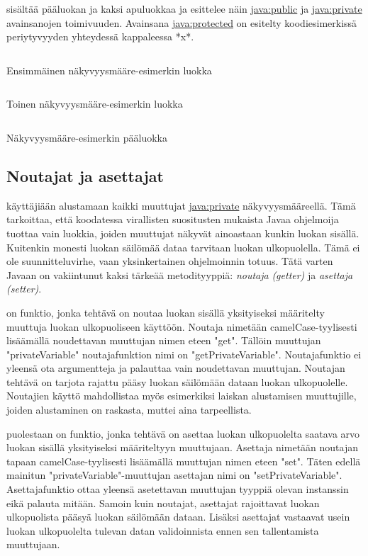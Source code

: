 \documentclass{tufte-book}
\newcommand{\eng}[1]{\textit{(#1)}}
\newcommand{\new}[1]{\textit{\gls{#1}}}
\newcommand{\neweng}[2]{\new{#1} \eng{#2}}
\newcommand{\java}[1]{\underline{\gls{java:#1}}}
\newcommand{\code}[3]{
\begin{listing}
    \inputminted{java}{OhjelmointiopasEsimerkit/src/#1/#2.java}
    \caption{#3}
    \label{Java-#1-#2}
\end{listing}
}
\begin{document}
 sisältää pääluokan ja kaksi apuluokkaa ja esittelee näin
\java{public} ja \java{private} avainsanojen toimivuuden. Avainsana \java{protected} on esitelty
koodiesimerkissä periytyvyyden yhteydessä kappaleessa *x*. %

\code{week2}{AccessModifierExampleFirstChild}{Ensimmäinen näkyvyysmääre-esimerkin luokka}
\code{week2}{AccessModifierExampleSecondChild}{Toinen näkyvyysmääre-esimerkin luokka}
\code{week2}{AccessModifierExampleMain}{Näkyvyysmääre-esimerkin pääluokka}

\subsection{Noutajat ja asettajat}

 käyttäjiään alustamaan kaikki muuttujat \java{private} näkyvyysmääreellä.
Tämä tarkoittaa, että koodatessa virallisten suositusten mukaista Javaa ohjelmoija tuottaa vain
luokkia, joiden muuttujat näkyvät ainoastaan kunkin luokan sisällä. Kuitenkin monesti luokan
säilömää dataa tarvitaan luokan ulkopuolella. Tämä ei ole suunnitteluvirhe, vaan yksinkertainen
ohjelmoinnin totuus. Tätä varten Javaan on vakiintunut kaksi tärkeää metodityyppiä:
\neweng{noutaja}{getter} ja \neweng{asettaja}{setter}.

 on funktio, jonka tehtävä on noutaa luokan sisällä yksityiseksi
määritelty muuttuja luokan ulkopuoliseen käyttöön. Noutaja nimetään camelCase-tyylisesti
lisäämällä noudettavan muuttujan nimen eteen "get". Tällöin muuttujan "privateVariable"
noutajafunktion nimi on "getPrivateVariable". Noutajafunktio ei yleensä ota argumentteja ja
palauttaa vain noudettavan muuttujan. Noutajan tehtävä on tarjota rajattu pääsy luokan
säilömään dataan luokan ulkopuolelle. Noutajien käyttö mahdollistaa myös esimerkiksi laiskan
alustamisen muuttujille, joiden alustaminen on raskasta, muttei aina tarpeellista.

 puolestaan on funktio, jonka tehtävä on asettaa luokan
ulkopuolelta saatava arvo luokan sisällä yksityiseksi määriteltyyn muuttujaan. Asettaja nimetään
noutajan tapaan camelCase-tyylisesti lisäämällä muuttujan nimen eteen "set". Täten edellä mainitun
"privateVariable"-muuttujan asettajan nimi on "setPrivateVariable". Asettajafunktio ottaa yleensä
asetettavan muuttujan tyyppiä olevan instanssin eikä palauta mitään. Samoin kuin noutajat,
asettajat rajoittavat luokan ulkopuolista pääsyä luokan säilömään dataan. Lisäksi asettajat
vastaavat usein luokan ulkopuolelta tulevan datan validoinnista ennen sen tallentamista
muuttujaan.
\end{document}
